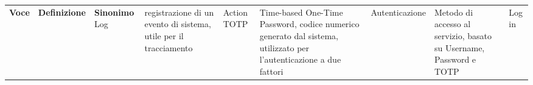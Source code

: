 \begin{center}

    \begin{tabularx}{\textwidth}
        {|c|>{\raggedright}X|l|}

        \hline {}
        \Large\textbf{Voce} & \Large\centering\textbf{Definizione}                                  & \Large\textbf{Sinonimo} %
        \n Log              &  registrazione di un evento di sistema, utile per il tracciamento & Action
        \n  TOTP               & Time-based One-Time Password, codice numerico generato dal sistema, utilizzato per l'autenticazione a due fattori &
        \n  Autenticazione     & Metodo di accesso al servizio, basato su Username, Password e TOTP& Log in
        \n
    \end{tabularx}
\end{center}
